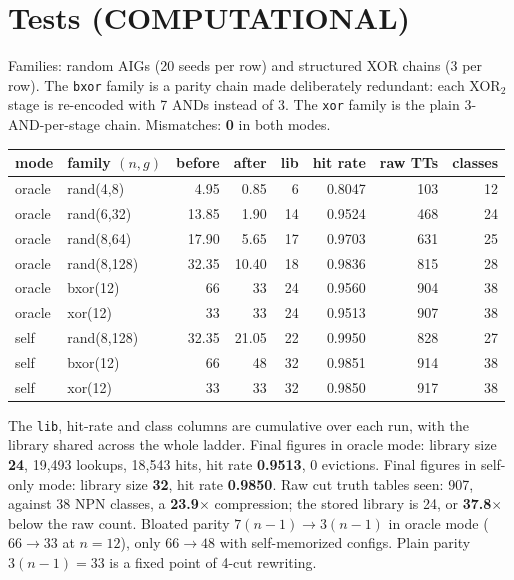 \documentclass[11pt]{article}
\begin{document}
\section{Tests (COMPUTATIONAL)}
Families: random AIGs (20 seeds per row) and structured XOR chains (3 per row). The \texttt{bxor} family is a parity chain made deliberately redundant: each XOR$_2$ stage is re-encoded with 7 ANDs instead of 3. The \texttt{xor} family is the plain 3-AND-per-stage chain. Mismatches: \textbf{0} in both modes.

\begin{center}\small
\begin{tabular}{llrrrrrr}
\toprule
mode & family $(n,g)$ & before & after & lib & hit rate & raw TTs & classes \\
\midrule
oracle & rand(4,8) & 4.95 & 0.85 & 6 & 0.8047 & 103 & 12\\
oracle & rand(6,32) & 13.85 & 1.90 & 14 & 0.9524 & 468 & 24\\
oracle & rand(8,64) & 17.90 & 5.65 & 17 & 0.9703 & 631 & 25\\
oracle & rand(8,128) & 32.35 & 10.40 & 18 & 0.9836 & 815 & 28\\
oracle & bxor(12) & 66 & 33 & 24 & 0.9560 & 904 & 38\\
oracle & xor(12) & 33 & 33 & 24 & 0.9513 & 907 & 38\\
\midrule
self & rand(8,128) & 32.35 & 21.05 & 22 & 0.9950 & 828 & 27\\
self & bxor(12) & 66 & 48 & 32 & 0.9851 & 914 & 38\\
self & xor(12) & 33 & 33 & 32 & 0.9850 & 917 & 38\\
\bottomrule
\end{tabular}
\end{center}
The \texttt{lib}, hit-rate and class columns are cumulative over each run, with the library shared across the whole ladder. Final figures in oracle mode: library size \textbf{24}, 19{,}493 lookups, 18{,}543 hits, hit rate \textbf{0.9513}, 0 evictions. Final figures in self-only mode: library size \textbf{32}, hit rate \textbf{0.9850}. Raw cut truth tables seen: 907, against 38 NPN classes, a \textbf{23.9}$\times$ compression; the stored library is 24, or \textbf{37.8}$\times$ below the raw count. Bloated parity $7(n-1)\to3(n-1)$ in oracle mode ($66\to33$ at $n=12$), only $66\to48$ with self-memorized configs. Plain parity $3(n-1)=33$ is a fixed point of 4-cut rewriting.
\end{document}

